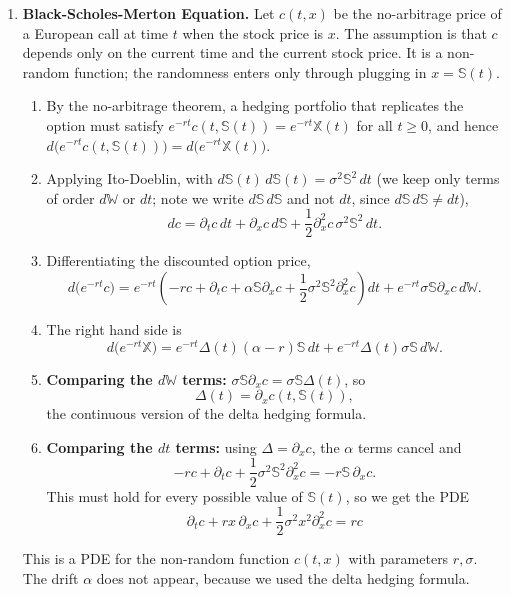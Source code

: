\begin{enumerate}
    \item \textbf{Black-Scholes-Merton Equation.} Let $c(t, x)$ be the no-arbitrage price of a European call at time $t$ when the stock price is $x$. The assumption is that $c$ depends only on the current time and the current stock price. It is a non-random function; the randomness enters only through plugging in $x = \mathbb{S}(t)$.
    \begin{enumerate}
        \item By the no-arbitrage theorem, a hedging portfolio that replicates the option must satisfy $e^{-rt}c(t, \mathbb{S}(t)) = e^{-rt}\mathbb{X}(t)$ for all $t \geq 0$, and hence $d\bigl(e^{-rt}c(t, \mathbb{S}(t))\bigr) = d\bigl(e^{-rt}\mathbb{X}(t)\bigr)$.
        \item Applying Ito-Doeblin, with $d\mathbb{S}(t)\, d\mathbb{S}(t) = \sigma^2\mathbb{S}^2\, dt$ (we keep only terms of order $d\mathbb{W}$ or $dt$; note we write $d\mathbb{S}\, d\mathbb{S}$ and not $dt$, since $d\mathbb{S}\, d\mathbb{S} \neq dt$),
        \[dc = \partial_t c\, dt + \partial_x c\, d\mathbb{S} + \frac{1}{2}\partial_x^2 c\, \sigma^2 \mathbb{S}^2\, dt.\]
        \item Differentiating the discounted option price,
        \[d\bigl(e^{-rt}c\bigr) = e^{-rt}\left(-rc + \partial_t c + \alpha\mathbb{S}\partial_x c + \frac{1}{2}\sigma^2\mathbb{S}^2\partial_x^2 c\right)dt + e^{-rt}\sigma\mathbb{S}\partial_x c\, d\mathbb{W}.\]
        \item The right hand side is
        \[d\bigl(e^{-rt}\mathbb{X}\bigr) = e^{-rt}\Delta(t)(\alpha - r)\mathbb{S}\, dt + e^{-rt}\Delta(t)\sigma\mathbb{S}\, d\mathbb{W}.\]
        \item \textbf{Comparing the $d\mathbb{W}$ terms:} $\sigma\mathbb{S}\partial_x c = \sigma\mathbb{S}\Delta(t)$, so
        \[\Delta(t) = \partial_x c(t, \mathbb{S}(t)),\]
        the continuous version of the delta hedging formula.
        \item \textbf{Comparing the $dt$ terms:} using $\Delta = \partial_x c$, the $\alpha$ terms cancel and
        \[-rc + \partial_t c + \frac{1}{2}\sigma^2\mathbb{S}^2\partial_x^2 c = -r\mathbb{S}\,\partial_x c.\]
        This must hold for every possible value of $\mathbb{S}(t)$, so we get the PDE
        \[\boxed{\partial_t c + r x\, \partial_x c + \frac{1}{2}\sigma^2 x^2 \partial_x^2 c = r c}\]
    \end{enumerate}
    This is a PDE for the non-random function $c(t, x)$ with parameters $r, \sigma$. The drift $\alpha$ does not appear, because we used the delta hedging formula.


\end{enumerate}
